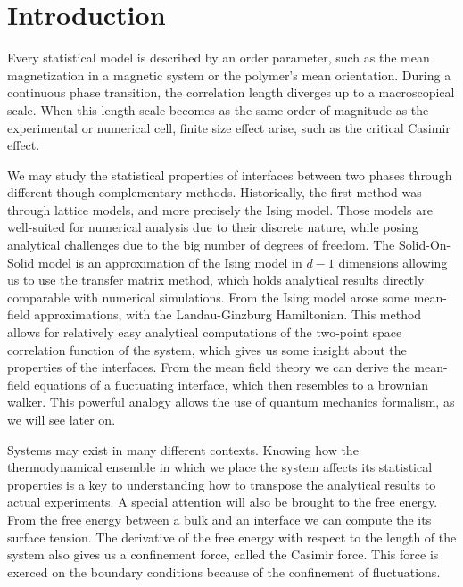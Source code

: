 \chapter*{Introduction}

{\color{blue}

Every statistical model is described by an order parameter, such as the mean magnetization in a magnetic system or the polymer's mean orientation. During a continuous phase transition, the correlation length diverges up to a macroscopical scale. When this length scale becomes as the same order of magnitude as the experimental or numerical cell, finite size effect arise, such as the critical Casimir effect.

We may study the statistical properties of interfaces between two phases through different though complementary methods. Historically, the first method was through lattice models, and more precisely the Ising model. Those models are well-suited for numerical analysis due to their discrete nature, while posing analytical challenges due to the big number of degrees of freedom. The Solid-On-Solid model is an approximation of the Ising model in $d-1$ dimensions allowing us to use the transfer matrix method, which holds analytical results directly comparable with numerical simulations.
From the Ising model arose some mean-field approximations, with the Landau-Ginzburg Hamiltonian. This method allows for relatively easy analytical computations of the two-point space correlation function of the system, which gives us some insight about the properties of the interfaces. 
From the mean field theory we can derive the mean-field equations of a fluctuating interface, which then resembles to a brownian walker. This powerful analogy allows the use of quantum mechanics formalism, as we will see later on.

Systems may exist in many different contexts. Knowing how the thermodynamical ensemble in which we place the system affects its statistical properties is a key to understanding how to transpose the analytical results to actual experiments. 
A special attention will also be brought to the free energy. From the free energy between a bulk and an interface we can compute the its surface tension. The derivative of the free energy with respect to the length of the system also gives us a confinement force, called the Casimir force. This force is exerced on the boundary conditions because of the confinement of fluctuations. 

}
